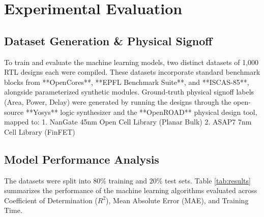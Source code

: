 \documentclass[conference]{IEEEtran}
\begin{document}
\section{Experimental Evaluation}
\subsection{Dataset Generation \& Physical Signoff}
To train and evaluate the machine learning models, two distinct datasets of 1,000 RTL designs each were compiled. These datasets incorporate standard benchmark blocks from **OpenCores**, **EPFL Benchmark Suite**, and **ISCAS-85**, alongside parameterized synthetic modules. Ground-truth physical signoff labels (Area, Power, Delay) were generated by running the designs through the open-source **Yosys** logic synthesizer and the **OpenROAD** physical design tool, mapped to:
1. NanGate 45nm Open Cell Library (Planar Bulk)
2. ASAP7 7nm Cell Library (FinFET)

\subsection{Model Performance Analysis}
The datasets were split into 80\% training and 20\% test sets. Table \ref{tab:results} summarizes the performance of the machine learning algorithms evaluated across Coefficient of Determination ($R^2$), Mean Absolute Error (MAE), and Training Time.
\end{document}

